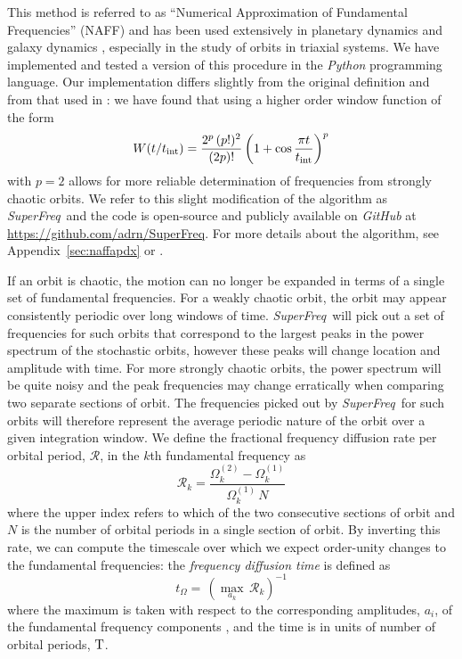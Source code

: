 \documentclass[letterpaper,12pt,preprint]{aastex}
\newcommand{\inttime}{t_{\rm int}}
\newcommand{\project}[1]{\textsl{#1}}
\newcommand{\superfreq}{\project{SuperFreq}}
\begin{document}
This method is referred to as ``Numerical Approximation of Fundamental Frequencies'' (NAFF) and has been used extensively in planetary dynamics \citep[e.g.,][]{laskar93b, laskar96} and galaxy dynamics \citep{papaphilippou98, valluri98}, especially in the study of orbits in triaxial systems. We have implemented and tested a version of this procedure in the \project{Python} programming language. Our implementation differs slightly from the original definition and from that used in \cite{valluri98}: we have found that using a higher order window function \citep[e.g.,][]{hunter02} of the form
\begin{equation}
	W(t/\inttime) = \frac{2^p \, (p!)^2}{(2p)!} \left( 1 + \cos \frac{\pi t}{\inttime}\right)^p
\end{equation}
with $p=2$ allows for more reliable determination of frequencies from strongly chaotic orbits. We refer to this slight modification of the algorithm as \superfreq\ and the code is open-source and publicly available on \project{GitHub} at \url{https://github.com/adrn/SuperFreq}. For more details about the algorithm, see Appendix~\ref{sec:naffapdx} or \cite{laskar88, laskar93, papaphilippou96}.

If an orbit is chaotic, the motion can no longer be expanded in terms of a single set of fundamental frequencies. For a weakly chaotic orbit, the orbit may appear consistently periodic over long windows of time. \superfreq\ will pick out a set of frequencies for such orbits that correspond to the largest peaks in the power spectrum of the stochastic orbits, however these peaks will change location and amplitude with time. For more strongly chaotic orbits, the power spectrum will be quite noisy and the peak frequencies may change erratically when comparing two separate sections of orbit. The frequencies picked out by \superfreq\ for such orbits will therefore represent the average periodic nature of the orbit over a given integration window. We define the fractional frequency diffusion rate per orbital period, $\mathcal{R}$, in the $k$th fundamental frequency as
\begin{equation}
	\mathcal{R}_k = \frac{\Omega_{k}^{(2)} - \Omega_{k}^{(1)}}{\Omega_{k}^{(1)} \, N} \label{eq:fdrate}
\end{equation}
where the upper index refers to which of the two consecutive sections of orbit and $N$ is the number of orbital periods in a single section of orbit. By inverting this rate, we can compute the timescale over which we expect order-unity changes to the fundamental frequencies: the \emph{frequency diffusion time} is defined as
\begin{equation}
	t_\Omega = \, (\max_{a_k} \, \mathcal{R}_k)^{-1} \label{eq:fdtime}
\end{equation}
where the maximum is taken with respect to the corresponding amplitudes, $a_i$, of the fundamental frequency components \citep[see][]{valluri12}, and the time is in units of number of orbital periods, ${\rm T}$. 
\end{document}
